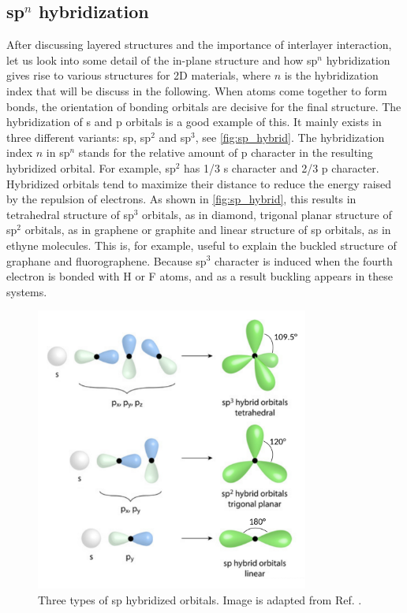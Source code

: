 \subsection{sp$^n$ hybridization\label{sphyb}}

After discussing layered structures and the importance of interlayer interaction, let us look into some detail of the in-plane structure and how sp$^n$ hybridization gives rise to various structures for 2D materials, where $n$ is the hybridization index that will be discuss in the following. When atoms come together to form bonds, the orientation of bonding orbitals are decisive for the final structure. The hybridization of s and p orbitals is a good example of this.  It mainly exists in three different variants: sp, sp$^2$ and sp$^3$, see \autoref{fig:sp_hybrid}. The hybridization index $n$ in sp$^n$ stands for the relative amount of p character in the resulting hybridized orbital. For example, sp$^2$ has 1/3 s character and 2/3 p character. Hybridized orbitals tend to maximize their distance to reduce the energy raised by the repulsion of electrons. As shown in \autoref{fig:sp_hybrid}, this results in tetrahedral structure of sp$^3$ orbitals, as in diamond, trigonal planar structure of sp$^2$ orbitals, as in graphene or graphite and linear structure of sp orbitals, as in ethyne molecules.  This is, for example, useful to explain the buckled structure of graphane and fluorographene. Because sp$^3$ character is induced when the fourth electron is bonded with H or F atoms, and as a result buckling appears in these systems. 

\begin{figure}[htb] 
\centering  
\includegraphics[width=0.8\textwidth]{sp_hybrid.png}
\caption[Three types of sp hybridized orbitals]{ Three types of sp hybridized orbitals. Image is adapted from Ref. \cite{sp_hybrid}. }  
\label{fig:sp_hybrid}
\end{figure} 

